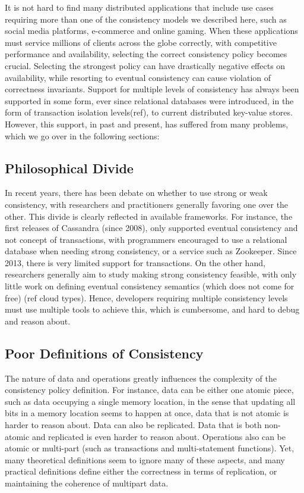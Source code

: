 It is not hard to find many distributed applications that include use cases
requiring more than one of the consistency models we described here, such as social media
platforms, e-commerce and online gaming. When these applications must service millions of
clients across the globe correctly, with competitive performance and
availability, selecting the correct consistency policy becomes crucial.
Selecting the strongest policy can have drastically negative effects on availability, while
resorting to eventual consistency can cause violation of correctness invariants.
Support for multiple levels of consistency has always been supported in some
form, ever since relational databases were introduced, in the form of
transaction isolation levels(ref), to current distributed key-value stores.
However, this support, in past and present, has suffered from many problems,
which we go over in the following sections:

\subsection{Philosophical Divide}
In recent years, there has been debate on whether to use strong or weak consistency, 
with researchers and practitioners generally favoring one over the other. This
divide is clearly reflected in available frameworks. For instance, the first
releases of Cassandra (since 2008), only supported eventual consistency and not
concept of transactions, with programmers encouraged to use a relational
database when needing strong consistency, or a service such as Zookeeper.
Since 2013, there is very limited support for transactions. On the other hand,
researchers generally aim to study making strong consistency feasible, with only
little work on defining eventual consistency semantics (which does not come for
free) (ref cloud types). Hence, developers requiring multiple
consistency levels must use multiple tools to achieve this, which is cumbersome,
and hard to debug and reason about. 

\subsection{Poor Definitions of Consistency}
The nature of data and operations
greatly influences the complexity of the consistency policy definition. For
instance, data can be either one atomic piece, such as data occupying a single
memory location, in the sense that updating all bits in a memory location seems
to happen at once, data that is not atomic is harder to reason about. Data can
also be replicated. Data that is both non-atomic and replicated is even harder
to reason about. Operations also can be atomic or multi-part (such as
transactions and multi-statement functions). Yet, many theoretical definitions
seem to ignore many of these aspects, and many practical definitions define
either the correctness in terms of replication, or maintaining the coherence of
multipart data. \\

